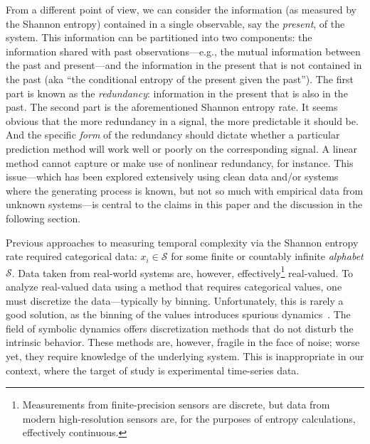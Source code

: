 \documentclass[%
pre,
reprint,
superscriptaddress,
showpacs,
nofootinbib,
nobibnotes,
 amsmath,amssymb,
 aps,
]{revtex4-1}
\begin{document}
From a different point of view, we can consider the information (as
measured by the Shannon entropy) contained in a single observable, say
the \emph{present}, of the system. This information can be partitioned
into two components: the information shared with past
observations---e.g., the mutual information between the past and
present---and the information in the present that is not contained in
the past (aka ``the conditional entropy of the present given the
past'').  The first part is known as the \emph{redundancy}:
information in the present that is also in the past.  The second part
is the aforementioned Shannon entropy rate.  It seems obvious that the
more redundancy in a signal, the more predictable it should be.  And
the specific \emph{form} of the redundancy should dictate whether a
particular prediction method will work well or poorly on the
corresponding signal.  A linear method cannot capture or make use of
nonlinear redundancy, for instance.  This issue---which has been
explored extensively using clean data and/or systems where the
generating process is known, but not so much with empirical data from
unknown systems---is central to the claims in this paper and the
discussion in the following section.

Previous approaches to measuring temporal complexity via the Shannon
entropy rate \cite{Shannon1951, mantegna1994linguistic} required
categorical data: $x_i \in \mathcal{S}$ for some finite or countably
infinite \emph{alphabet} $\mathcal{S}$.  Data taken from real-world
systems are, however, effectively\footnote{Measurements from
  finite-precision sensors are discrete, but data from modern
  high-resolution sensors are, for the purposes of entropy
  calculations, effectively continuous.}  real-valued.  To analyze
real-valued data using a method that requires categorical values, one
must discretize the data---typically by binning.  Unfortunately, this
is rarely a good solution, as the binning of the values introduces
spurious dynamics~\cite{bollt2001}.  The field of symbolic dynamics
offers discretization methods that do not disturb the intrinsic
behavior.  These methods are, however, fragile in the face of noise;
worse yet, they require knowledge of the underlying system.  This is
inappropriate in our context, where the target of study is
experimental time-series data.
\end{document}
